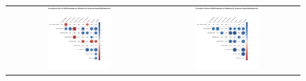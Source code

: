 \begin{figure}[htb]
\begin{tabular}{cc}
 \includegraphics[width=0.45\textwidth]{images/chap-evaluation/corr-signedup-third/wo-gamifiedApprentice1.png}&
 \includegraphics[width=0.45\textwidth]{images/chap-evaluation/corr-signedup-third/ont-gamifiedApprentice1.png}
 \end{tabular}
 \fautor
\end{figure}


